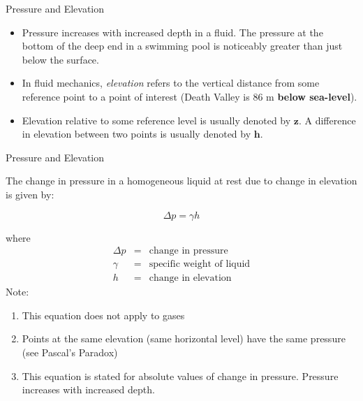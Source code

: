 \documentclass[9pt,xcolor={svgnames, x11names},professionalfonts, mathserif]{beamer}
\begin{document}
\begin{frame}{Pressure and Elevation}
 \begin{itemize}
  \item Pressure increases with increased depth in a fluid. The pressure at
        the bottom of the deep end in a swimming pool is noticeably greater
        than just below the surface. \pause\parb
  \item In fluid mechanics, \emph{elevation} refers to the vertical distance
        from some reference point to a point of interest (Death Valley is
        86 m \textbf{below sea-level}). \pause\parb
  \item Elevation relative to some reference level is usually denoted by $\bm z$. \lb A difference in elevation between two points is usually denoted by $\bm h$.
 \end{itemize}
\end{frame}

\begin{frame}{Pressure and Elevation}
 
 
 The change in pressure in a homogeneous liquid at rest due to change
 in elevation is given by:
 \begin{center}
  \begin{mybox}[width=4cm]
   \[\Delta p=\gamma h\]
  \end{mybox}
 \end{center}
 
 where
 \vspace{-0.5cm}
 \begin{eqnarray*}
  \Delta p & = & \text{change  in  pressure}\\
  \gamma & = & \text{specific weight of  liquid}\\
  h & = & \text{change in elevation}
 \end{eqnarray*} \pause
 Note:
 \begin{enumerate}
  \item This equation does not apply to gases
  \item Points at the same elevation (same horizontal level) have the same
        pressure (see Pascal's Paradox)
  \item This equation is stated for absolute values of change in pressure. \lb Pressure increases with increased depth.
 \end{enumerate}
 
\end{frame}
\end{document}
